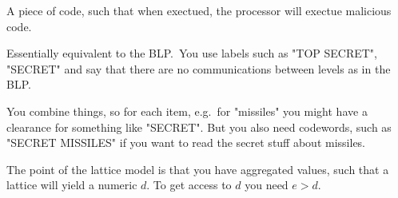 \begin{definition}
	A piece of code, such that when exectued, the processor
	will exectue malicious code.
\end{definition}

\begin{definition}
    Essentially equivalent to the BLP.\ You use labels such as "TOP SECRET",
    "SECRET" and say that there are no communications between levels as in the
    BLP.\

    You combine things, so for each item, e.g.\ for "missiles" you might have a
    clearance for something like "SECRET". But you also need codewords, such as
    "SECRET MISSILES" if you want to read the
	secret stuff about missiles.

    The point of the lattice model is that you have aggregated values, such
    that a lattice will yield a numeric $d$. To get access to $d$ you need $e >
    d$.
\end{definition}

\begin{definition}[Malware]
\end{definition}

